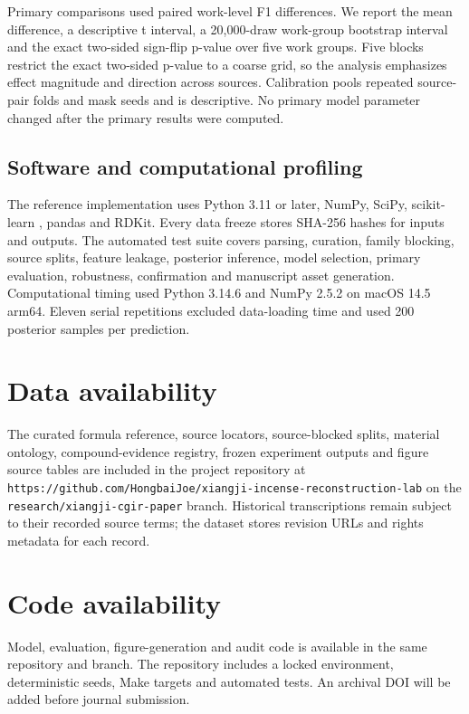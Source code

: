 \documentclass[12pt]{article}
\begin{document}
Primary comparisons used paired work-level F1 differences. We report the mean difference, a descriptive t interval, a 20,000-draw work-group bootstrap interval and the exact two-sided sign-flip p-value over five work groups. Five blocks restrict the exact two-sided p-value to a coarse grid, so the analysis emphasizes effect magnitude and direction across sources. Calibration pools repeated source-pair folds and mask seeds and is descriptive. No primary model parameter changed after the primary results were computed.

\subsection*{Software and computational profiling}

The reference implementation uses Python 3.11 or later, NumPy, SciPy, scikit-learn \cite{ref21}, pandas and RDKit. Every data freeze stores SHA-256 hashes for inputs and outputs. The automated test suite covers parsing, curation, family blocking, source splits, feature leakage, posterior inference, model selection, primary evaluation, robustness, confirmation and manuscript asset generation. Computational timing used Python 3.14.6 and NumPy 2.5.2 on macOS 14.5 arm64. Eleven serial repetitions excluded data-loading time and used 200 posterior samples per prediction.

\section*{Data availability}

The curated formula reference, source locators, source-blocked splits, material ontology, compound-evidence registry, frozen experiment outputs and figure source tables are included in the project repository at \nolinkurl{https://github.com/HongbaiJoe/xiangji-incense-reconstruction-lab} on the \texttt{research/xiangji-cgir-paper} branch. Historical transcriptions remain subject to their recorded source terms; the dataset stores revision URLs and rights metadata for each record.

\section*{Code availability}

Model, evaluation, figure-generation and audit code is available in the same repository and branch. The repository includes a locked environment, deterministic seeds, Make targets and automated tests. An archival DOI will be added before journal submission.
\end{document}
